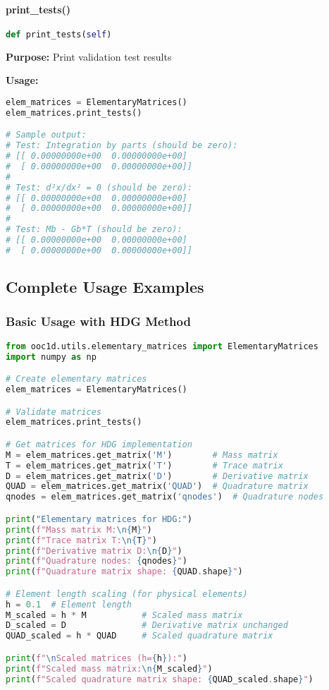 \paragraph{print\_tests()}\leavevmode
\begin{lstlisting}[language=Python, caption=Print Tests Method]
def print_tests(self)
\end{lstlisting}

\textbf{Purpose:} Print validation test results

\textbf{Usage:}
\begin{lstlisting}[language=Python, caption=Print Tests Usage]
elem_matrices = ElementaryMatrices()
elem_matrices.print_tests()

# Sample output:
# Test: Integration by parts (should be zero):
# [[ 0.00000000e+00  0.00000000e+00]
#  [ 0.00000000e+00  0.00000000e+00]]
# 
# Test: d²x/dx² = 0 (should be zero):
# [[ 0.00000000e+00  0.00000000e+00]
#  [ 0.00000000e+00  0.00000000e+00]]
#
# Test: Mb - Gb*T (should be zero):
# [[ 0.00000000e+00  0.00000000e+00]
#  [ 0.00000000e+00  0.00000000e+00]]
\end{lstlisting}

\subsection{Complete Usage Examples}
\label{subsec:elementary_matrices_complete_examples}

\subsubsection{Basic Usage with HDG Method}

\begin{lstlisting}[language=Python, caption=Basic HDG Usage Example]
from ooc1d.utils.elementary_matrices import ElementaryMatrices
import numpy as np

# Create elementary matrices
elem_matrices = ElementaryMatrices()

# Validate matrices
elem_matrices.print_tests()

# Get matrices for HDG implementation
M = elem_matrices.get_matrix('M')        # Mass matrix
T = elem_matrices.get_matrix('T')        # Trace matrix
D = elem_matrices.get_matrix('D')        # Derivative matrix
QUAD = elem_matrices.get_matrix('QUAD')  # Quadrature matrix
qnodes = elem_matrices.get_matrix('qnodes')  # Quadrature nodes

print("Elementary matrices for HDG:")
print(f"Mass matrix M:\n{M}")
print(f"Trace matrix T:\n{T}")
print(f"Derivative matrix D:\n{D}")
print(f"Quadrature nodes: {qnodes}")
print(f"Quadrature matrix shape: {QUAD.shape}")

# Element length scaling (for physical elements)
h = 0.1  # Element length
M_scaled = h * M           # Scaled mass matrix
D_scaled = D               # Derivative matrix unchanged
QUAD_scaled = h * QUAD     # Scaled quadrature matrix

print(f"\nScaled matrices (h={h}):")
print(f"Scaled mass matrix:\n{M_scaled}")
print(f"Scaled quadrature matrix shape: {QUAD_scaled.shape}")
\end{lstlisting}

